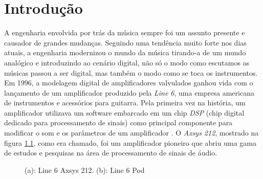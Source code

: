 \chapter[Introdução]{Introdução}


A engenharia envolvida por trás da música sempre foi um assunto presente e causador de grandes mudanças. Seguindo uma tendência muito forte nos dias atuais, a engenharia modernizou o mundo da música tirando-a de um mundo analógico e introduzindo ao cenário digital, não só o modo como escutamos as músicas passou a ser digital, mas também o modo como se toca os instrumentos. Em 1996, a modelagem digital de amplificadores valvulados ganhou vida com o lançamento de um amplificador produzido pela \textit{Line 6}, uma empresa americana de instrumentos e acessórios para guitarra. Pela primeira vez na história, um amplificador utilizava um software embarcado em um chip \textit{DSP} (chip digital dedicado para processamento de sinais) como principal componente para modificar o som e os parâmetros de um amplificador \cite{paulwhite_line6_line6_line6_2006}. O \textit{Axsys 212}, mostrado na figura \ref{fig1}, como era chamado, foi um amplificador pioneiro que abriu uma gama de estudos e pesquisas na área de processamento de sinais de áudio.

\begin{figure}
	\centering
	\caption{(a): Line 6 Axsys 212. (b): Line 6 Pod }
	\label{fig1}
\end{figure}



